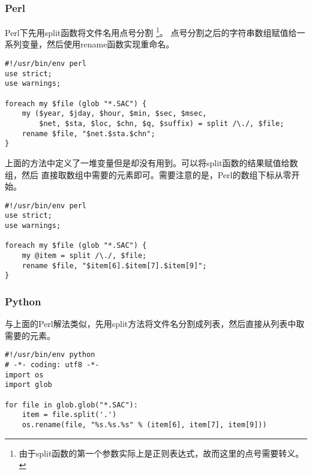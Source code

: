 \subsubsection*{Perl}
Perl下先用split函数将文件名用点号分割
\footnote{由于split函数的第一个参数实际上是正则表达式，故而这里的点号需要转义。}。
点号分割之后的字符串数组赋值给一系列变量，然后使用rename函数实现重命名。
\begin{verbatim}
#!/usr/bin/env perl
use strict;
use warnings;

foreach my $file (glob "*.SAC") {
    my ($year, $jday, $hour, $min, $sec, $msec,
        $net, $sta, $loc, $chn, $q, $suffix) = split /\./, $file;
    rename $file, "$net.$sta.$chn";
}
\end{verbatim}

上面的方法中定义了一堆变量但是却没有用到。可以将split函数的结果赋值给数组，然后
直接取数组中需要的元素即可。需要注意的是，Perl的数组下标从零开始。
\begin{verbatim}
#!/usr/bin/env perl
use strict;
use warnings;

foreach my $file (glob "*.SAC") {
    my @item = split /\./, $file;
    rename $file, "$item[6].$item[7].$item[9]";
}
\end{verbatim}

\subsubsection*{Python}
与上面的Perl解法类似，先用split方法将文件名分割成列表，然后直接从列表中取
需要的元素。
\begin{verbatim}
#!/usr/bin/env python
# -*- coding: utf8 -*-
import os
import glob

for file in glob.glob("*.SAC"):
    item = file.split('.')
    os.rename(file, "%s.%s.%s" % (item[6], item[7], item[9]))
\end{verbatim}
